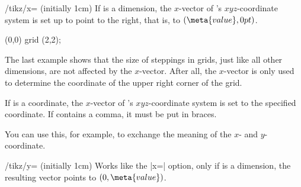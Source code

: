 \begin{key}{/tikz/x= (initially 1cm)}
    If  is a dimension, the $x$-vector of \pgfname's
    $xyz$-coordinate system is set up to point  to the right, that
    is, to $(\meta{value},0pt)$.
\begin{codeexample}[]
\end{codeexample}

\begin{codeexample}[]
\tikz \draw[x=1.5cm] (0,0) grid (2,2);
\end{codeexample}

    The last example shows that the size of steppings in grids, just like all
    other dimensions, are not affected by the $x$-vector. After all, the
    $x$-vector is only used to determine the coordinate of the upper right
    corner of the grid.

    If  is a coordinate, the $x$-vector of \pgfname's
    $xyz$-coordinate system is set to the specified coordinate. If 
    contains a comma, it must be put in braces.
\begin{codeexample}[]
\end{codeexample}

    You can use this, for example, to exchange the meaning of the $x$- and
    $y$-coordinate.
\begin{codeexample}[]
\end{codeexample}
\end{key}

\begin{key}{/tikz/y= (initially 1cm)}
    Works like the |x=| option, only if  is a dimension, the
    resulting vector points to $(0,\meta{value})$.
\end{key}

